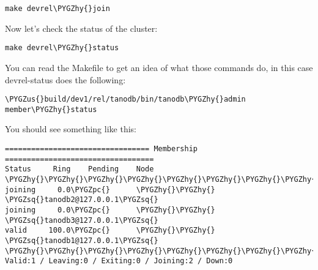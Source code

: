 \documentclass[letterpaper,10pt,english]{sphinxmanual}
\def\PYGZus{\char`\_}
\def\PYGZpc{\char`\%}
\def\PYGZhy{\char`\-}
\def\PYGZsq{\char`\'}
\renewcommand\PYGZsq{\textquotesingle}
\begin{document}
\begin{Verbatim}[commandchars=\\\{\}]
make devrel\PYGZhy{}join
\end{Verbatim}

Now let's check the status of the cluster:

\begin{Verbatim}[commandchars=\\\{\}]
make devrel\PYGZhy{}status
\end{Verbatim}

You can read the Makefile to get an idea of what those commands do, in this case
devrel-status does the following:

\begin{Verbatim}[commandchars=\\\{\}]
\PYGZus{}build/dev1/rel/tanodb/bin/tanodb\PYGZhy{}admin member\PYGZhy{}status
\end{Verbatim}

You should see something like this:

\begin{Verbatim}[commandchars=\\\{\}]
================================= Membership ==================================
Status     Ring    Pending    Node
\PYGZhy{}\PYGZhy{}\PYGZhy{}\PYGZhy{}\PYGZhy{}\PYGZhy{}\PYGZhy{}\PYGZhy{}\PYGZhy{}\PYGZhy{}\PYGZhy{}\PYGZhy{}\PYGZhy{}\PYGZhy{}\PYGZhy{}\PYGZhy{}\PYGZhy{}\PYGZhy{}\PYGZhy{}\PYGZhy{}\PYGZhy{}\PYGZhy{}\PYGZhy{}\PYGZhy{}\PYGZhy{}\PYGZhy{}\PYGZhy{}\PYGZhy{}\PYGZhy{}\PYGZhy{}\PYGZhy{}\PYGZhy{}\PYGZhy{}\PYGZhy{}\PYGZhy{}\PYGZhy{}\PYGZhy{}\PYGZhy{}\PYGZhy{}\PYGZhy{}\PYGZhy{}\PYGZhy{}\PYGZhy{}\PYGZhy{}\PYGZhy{}\PYGZhy{}\PYGZhy{}\PYGZhy{}\PYGZhy{}\PYGZhy{}\PYGZhy{}\PYGZhy{}\PYGZhy{}\PYGZhy{}\PYGZhy{}\PYGZhy{}\PYGZhy{}\PYGZhy{}\PYGZhy{}\PYGZhy{}\PYGZhy{}\PYGZhy{}\PYGZhy{}\PYGZhy{}\PYGZhy{}\PYGZhy{}\PYGZhy{}\PYGZhy{}\PYGZhy{}\PYGZhy{}\PYGZhy{}\PYGZhy{}\PYGZhy{}\PYGZhy{}\PYGZhy{}\PYGZhy{}\PYGZhy{}\PYGZhy{}\PYGZhy{}
joining     0.0\PYGZpc{}      \PYGZhy{}\PYGZhy{}      \PYGZsq{}tanodb2@127.0.0.1\PYGZsq{}
joining     0.0\PYGZpc{}      \PYGZhy{}\PYGZhy{}      \PYGZsq{}tanodb3@127.0.0.1\PYGZsq{}
valid     100.0\PYGZpc{}      \PYGZhy{}\PYGZhy{}      \PYGZsq{}tanodb1@127.0.0.1\PYGZsq{}
\PYGZhy{}\PYGZhy{}\PYGZhy{}\PYGZhy{}\PYGZhy{}\PYGZhy{}\PYGZhy{}\PYGZhy{}\PYGZhy{}\PYGZhy{}\PYGZhy{}\PYGZhy{}\PYGZhy{}\PYGZhy{}\PYGZhy{}\PYGZhy{}\PYGZhy{}\PYGZhy{}\PYGZhy{}\PYGZhy{}\PYGZhy{}\PYGZhy{}\PYGZhy{}\PYGZhy{}\PYGZhy{}\PYGZhy{}\PYGZhy{}\PYGZhy{}\PYGZhy{}\PYGZhy{}\PYGZhy{}\PYGZhy{}\PYGZhy{}\PYGZhy{}\PYGZhy{}\PYGZhy{}\PYGZhy{}\PYGZhy{}\PYGZhy{}\PYGZhy{}\PYGZhy{}\PYGZhy{}\PYGZhy{}\PYGZhy{}\PYGZhy{}\PYGZhy{}\PYGZhy{}\PYGZhy{}\PYGZhy{}\PYGZhy{}\PYGZhy{}\PYGZhy{}\PYGZhy{}\PYGZhy{}\PYGZhy{}\PYGZhy{}\PYGZhy{}\PYGZhy{}\PYGZhy{}\PYGZhy{}\PYGZhy{}\PYGZhy{}\PYGZhy{}\PYGZhy{}\PYGZhy{}\PYGZhy{}\PYGZhy{}\PYGZhy{}\PYGZhy{}\PYGZhy{}\PYGZhy{}\PYGZhy{}\PYGZhy{}\PYGZhy{}\PYGZhy{}\PYGZhy{}\PYGZhy{}\PYGZhy{}\PYGZhy{}
Valid:1 / Leaving:0 / Exiting:0 / Joining:2 / Down:0
\end{Verbatim}
\end{document}
